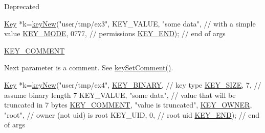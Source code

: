 \begin{DoxyRefDesc}{Deprecated}
\begin{DoxyItemize}
\begin{DoxyCodeInclude}
\hyperlink{classkdb_1_1Key_a5679f5cae63caddd64a60388b9cc77fa}{Key} *k=\hyperlink{group__key_gad23c65b44bf48d773759e1f9a4d43b89}{keyNew}(\textcolor{stringliteral}{"user/tmp/ex3"},
        KEY\_VALUE, \textcolor{stringliteral}{"some data"},    \textcolor{comment}{// with a simple value}
        \hyperlink{group__key_gga91fb3178848bd682000958089abbaf40a1b0a91ff3a855d6993930ebf0abaa518}{KEY\_MODE}, 0777,            \textcolor{comment}{// permissions}
        \hyperlink{group__key_gga91fb3178848bd682000958089abbaf40aa8adb6fcb92dec58fb19410eacfdd403}{KEY\_END});                  \textcolor{comment}{// end of args}
\end{DoxyCodeInclude}

\item \hyperlink{group__key_gga91fb3178848bd682000958089abbaf40ac29427bb47cc31689d02912e36161ee3}{K\-E\-Y\-\_\-\-C\-O\-M\-M\-E\-N\-T} \par
 Next parameter is a comment. See \hyperlink{group__keyvalue_ga8863a877a84fa46e6017fe72e49b89c1}{key\-Set\-Comment()}. 
\begin{DoxyCodeInclude}
\hyperlink{classkdb_1_1Key_a5679f5cae63caddd64a60388b9cc77fa}{Key} *k=\hyperlink{group__key_gad23c65b44bf48d773759e1f9a4d43b89}{keyNew}(\textcolor{stringliteral}{"user/tmp/ex4"},
        \hyperlink{group__key_gga91fb3178848bd682000958089abbaf40a1ca18d4e094ae7487d35ecedda2235ff}{KEY\_BINARY},                   \textcolor{comment}{// key type}
        \hyperlink{group__key_gga91fb3178848bd682000958089abbaf40a6d531b5c41445d19d0452eebdccbfa01}{KEY\_SIZE}, 7,                    \textcolor{comment}{// assume binary length 7}
        KEY\_VALUE, \textcolor{stringliteral}{"some data"},         \textcolor{comment}{// value that will be truncated in 7
       bytes}
        \hyperlink{group__key_gga91fb3178848bd682000958089abbaf40ac29427bb47cc31689d02912e36161ee3}{KEY\_COMMENT}, \textcolor{stringliteral}{"value is truncated"},
        \hyperlink{group__key_gga91fb3178848bd682000958089abbaf40a77ca60362fa8daca8d5347db4385068b}{KEY\_OWNER}, \textcolor{stringliteral}{"root"},             \textcolor{comment}{// owner (not uid) is root}
        KEY\_UID, 0,                     \textcolor{comment}{// root uid}
        \hyperlink{group__key_gga91fb3178848bd682000958089abbaf40aa8adb6fcb92dec58fb19410eacfdd403}{KEY\_END});                        \textcolor{comment}{// end of args}
\end{DoxyCodeInclude}

\end{DoxyItemize}\end{DoxyRefDesc}



